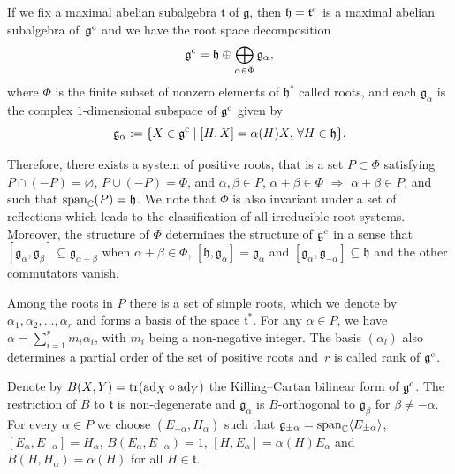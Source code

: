 \documentclass[pdftex]{sigma}
\numberwithin{equation}{section}
\begin{document}
If we fix a maximal abelian subalgebra $\mathfrak t$ of $\mathfrak g$, then $\mathfrak h= \mathfrak t^{\rm c}$ is a maximal abelian subalgebra of~$\mathfrak g^{\rm c}$ and we have the root space decomposition
\[
\mathfrak g^{\rm c} = \mathfrak{h} \oplus \bigoplus_{\alpha \in \Phi} \mathfrak g_{\alpha},
\]
where $\Phi$ is the finite subset of nonzero elements of ${\mathfrak h}^*$ called roots, and each $\mathfrak g_{\alpha}$ is the complex $1$-dimensional subspace of $\mathfrak g^{\rm c} $ given by
\[
\mathfrak g_{\alpha} := \{ X \in {\mathfrak g}^{\rm c} \mid [H , X] = \alpha (H) X, \, \forall H \in \mathfrak{h} \}.
\]

Therefore, there exists a system of positive roots, that is a set $P \subset \Phi$ satisfying $P \cap (- P) = \varnothing$, $ P \cup (-P)=\Phi$, and $\alpha, \beta \in P$, $ \alpha + \beta \in \Phi$ $\Rightarrow$ $\alpha + \beta \in P$, and such that ${\rm {span}}_{\mathbb C}(P) = \mathfrak h$. We note that $\Phi$ is also invariant under a set of reflections which leads to the classification of all irreducible root systems. Moreover, the structure of $\Phi$ determines the structure of $\mathfrak g^{\rm c}$ in a sense that $[\mathfrak g_{\alpha}, \mathfrak g_{\beta}] \subseteq \mathfrak g_{\alpha +\beta}$ when $\alpha+\beta \in \Phi$, $[\mathfrak h,\mathfrak g_{\alpha}] = \mathfrak g_{\alpha}$ and $[\mathfrak g_{\alpha}, \mathfrak g_{-\alpha}] \subseteq \mathfrak h$ and the other commutators vanish.

Among the roots in $P$ there is a set of simple roots, which we denote by $\alpha_1, \alpha_2,\dots ,\alpha_r$ and forms a basis of the space $\mathfrak t^*$. For any $\alpha \in P$, we have $\alpha = \sum_{i =1}^r m_i\alpha_i$, with $m_i$ being a non-negative integer. The basis $(\alpha_l)$ also determines a partial order of the set of positive roots and~$r$ is called rank of $\mathfrak g^{\rm c}$.

Denote by $B(X,Y) = {\rm tr} ({\rm ad}_X \circ {\rm ad}_Y)$ the Killing--Cartan bilinear form of $\mathfrak g^{\rm c}$. The restriction of $B$ to $\mathfrak t$ is non-degenerate and $\mathfrak g_{\alpha}$ is $B$-orthogonal to $\mathfrak g_{\beta}$ for $\beta \neq - \alpha$.
 For every $\alpha \in P$ we choose $(E_{\pm \alpha}, H_{\alpha})$ such that $\mathfrak g_{\pm \alpha}= {\rm {span}}_{\mathbb C} \langle E_{\pm\alpha}\rangle$, $[E_{\alpha}, E_{-\alpha}]=H_{\alpha}$, $B(E_{\alpha}, E_{-\alpha}) = 1$, $[H, E_{\alpha}] = \alpha(H)E_{\alpha}$ and $B(H, H_{\alpha}) = \alpha(H)$ for all $H \in \mathfrak t$.
\end{document}
